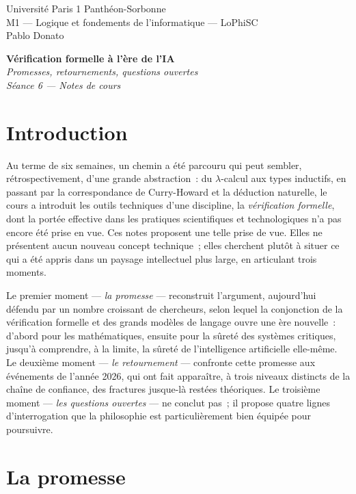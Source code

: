 \documentclass[11pt,a4paper]{article}
\begin{document}
\noindent
Université Paris 1 Panthéon-Sorbonne\\
M1 --- Logique et fondements de l'informatique --- LoPhiSC\\
Pablo Donato

\vspace{2em}
\begin{center}
{\LARGE\bfseries Vérification formelle à l'ère de l'IA}\\[0.5em]
{\large\itshape Promesses, retournements, questions ouvertes}\\[1em]
{\small\itshape Séance 6 --- Notes de cours}
\end{center}
\bigskip

\section*{Introduction}

Au terme de six semaines, un chemin a été parcouru qui peut sembler, rétrospectivement, d'une grande abstraction~: du $\lambda$-calcul aux types inductifs, en passant par la correspondance de Curry-Howard et la déduction naturelle, le cours a introduit les outils techniques d'une discipline, la \emph{vérification formelle}, dont la portée effective dans les pratiques scientifiques et technologiques n'a pas encore été prise en vue. Ces notes proposent une telle prise de vue. Elles ne présentent aucun nouveau concept technique~; elles cherchent plutôt à situer ce qui a été appris dans un paysage intellectuel plus large, en articulant trois moments.

Le premier moment --- \emph{la promesse} --- reconstruit l'argument, aujourd'hui défendu par un nombre croissant de chercheurs, selon lequel la conjonction de la vérification formelle et des grands modèles de langage ouvre une ère nouvelle~: d'abord pour les mathématiques, ensuite pour la sûreté des systèmes critiques, jusqu'à comprendre, à la limite, la sûreté de l'intelligence artificielle elle-même. Le deuxième moment --- \emph{le retournement} --- confronte cette promesse aux événements de l'année 2026, qui ont fait apparaître, à trois niveaux distincts de la chaîne de confiance, des fractures jusque-là restées théoriques. Le troisième moment --- \emph{les questions ouvertes} --- ne conclut pas~; il propose quatre lignes d'interrogation que la philosophie est particulièrement bien équipée pour poursuivre.

\bigskip

\section{La promesse}
\end{document}
